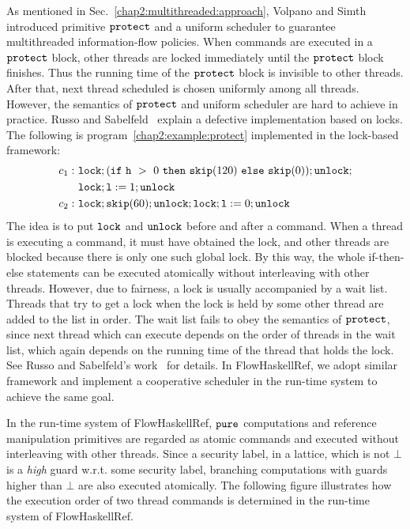 \documentclass[a4paper]{report}
\newcommand{\co}[1]{$\cod{#1}$}
\begin{document}
As mentioned in Sec.~\ref{chap2:multithreaded:approach}, Volpano and Simth~\cite{Volpano:Smith:Probabilistic}
introduced primitive \co{protect} and a uniform scheduler to guarantee multithreaded information-flow policies. 
When commands are executed in a \co{protect} block, other threads are locked
immediately until the \co{protect} block finishes. 
Thus the running time of the \co{protect} block is invisible to other threads. After that, next thread
scheduled is chosen uniformly among all threads.
However, the semantics of \co{protect} and uniform scheduler are hard to achieve in practice. 
Russo and Sabelfeld~\cite{Russo:Sabelfeld:CSFW06}
explain a defective implementation based on locks. 
The following is program~\ref{chap2:example:protect} implemented in the lock-based framework:
\begin{align*}
c_1:&~\mathtt{lock};(\mathtt{if}~\mathtt{h}~>~0~\mathtt{then}~\mathtt{skip}(120)~\mathtt{else}~\mathtt{skip}(0));\mathtt{unlock}; \\
    &~\mathtt{lock};\mathtt{l}:=1;\mathtt{unlock} \\
c_2:&~\mathtt{lock};\mathtt{skip}(60);\mathtt{unlock};\mathtt{lock};\mathtt{l}:=0;\mathtt{unlock}
\end{align*}
The idea is to put \co{lock} and \co{unlock} before and after a command. When a thread is executing a command,
it must have obtained the lock, and other threads are blocked because there is only one such global lock. By this way, the
whole if-then-else statements can be executed atomically without interleaving with other threads.
However, due to fairness, a lock is usually accompanied by a wait
list. Threads that try to get a lock when the lock is held by some other thread are added to the list in order. 
The wait list fails to obey the semantics of \co{protect}, since next thread which can execute depends on the order
of threads in the wait list, which again depends on the running time of the thread that holds the lock.
See Russo and Sabelfeld's work~\cite{Russo:Sabelfeld:CSFW06} for details.
In FlowHaskellRef, we adopt similar framework and implement a cooperative scheduler in the run-time system to
achieve the same goal.

In the run-time system of FlowHaskellRef, \co{pure} computations and reference manipulation primitives are
regarded as atomic commands and executed without interleaving with other threads. 
Since a security label, in a lattice, which is not $\bot$ is a {\em high} guard w.r.t. some security label,
branching computations with guards higher than $\bot$ are also executed atomically.
The following figure illustrates how the execution order of two thread commands is determined in the 
run-time system of FlowHaskellRef.
\end{document}
